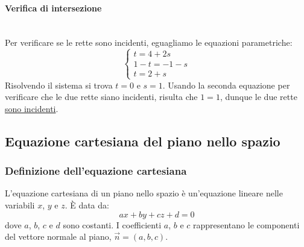 \documentclass{article}
\begin{document}
\paragraph{Verifica di intersezione} \phantom{}\\
Per verificare se le rette sono incidenti, eguagliamo le equazioni parametriche:
\[
    \begin{cases}
        t = 4 + 2s \\
        1 - t = -1 - s \\
        t = 2 + s
    \end{cases}
\]
Risolvendo il sistema si trova \(t = 0\) e \(s=1\).
Usando la seconda equazione per verificare che le due rette siano incidenti, risulta che
\(1=1\), dunque le due rette \underline{sono incidenti}.
\vspace*{1cm}
\begin{center}
\end{center}

\newpage
\subsection{Equazione cartesiana del piano nello spazio}

\subsubsection{Definizione dell'equazione cartesiana}
L'equazione cartesiana di un piano nello spazio è un'equazione lineare nelle variabili
\(x\), \(y\) e \(z\). È data da:
\[
    ax + by + cz + d = 0
\]
dove \(a\), \(b\), \(c\) e \(d\) sono costanti. I coefficienti \(a\), \(b\) e \(c\)
rappresentano le componenti del vettore normale al piano, \(\vec{n} = (a, b, c)\).
\end{document}

